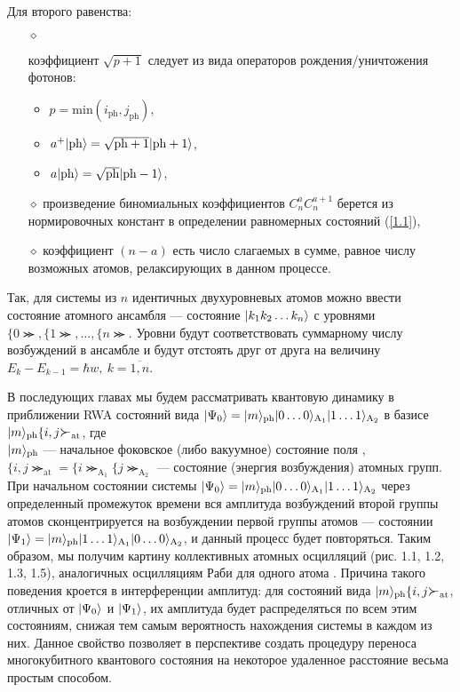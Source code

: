 Для второго равенства:
\begin{itemize}
	\item[$\diamond$]{
		коэффициент $\sqrt{p+1}$ следует из вида операторов рождения/уничтожения фотонов: 
		\begin{itemize}
			\item{$p = \mathrm{min}(i_{\mathrm{ph}}, j_{\mathrm{ph}})$,}
			\item{$a^{+}|\mathrm{ph}\rangle = \sqrt{\mathrm{ph} + 1}|\mathrm{ph} + 1\rangle$,}
			\item{$a|\mathrm{ph}\rangle = \sqrt{\mathrm{ph}}|\mathrm{ph-1}\rangle$,}
		\end{itemize}
	}
	\item[$\diamond$]{ 
		произведение биномиальных коэффициентов $C_{n}^{a}C_{n}^{a+1}$ берется из нормировочных констант в определении 	равномерных состояний (\ref{1.1})},
	\item[$\diamond$]{
		коэффициент $(n-a)$ есть число слагаемых в сумме, равное числу возможных атомов, релаксирующих в данном процессе.}
\end{itemize}

Так, для системы из $n$ идентичных двухуровневых атомов можно ввести состояние атомного ансамбля --- состояние $|k_{1}k_{2}\dots k_{n}\rangle$ с уровнями $\{0\Succ, \{1\Succ, \dots, \{n\Succ$. Уровни будут соответствовать суммарному числу возбуждений в ансамбле и будут отстоять друг от друга на величину $E_{k} - E_{k-1} = \hbar w,\ k = \overline{1,n}$.

В последующих главах мы будем рассматривать квантовую динамику в приближении RWA \cite{ozhigov_qq, rwa_1, rwa_2} состояний вида $|\Psi_0\rangle=|m\rangle_{\mathrm{ph}}|0\dots0\rangle_{\mathrm{A_{1}}} |1\dots1\rangle_{\mathrm{A_{2}}}$ в базисе $|m\ra_{\mathrm{ph}}\{i,j\Succ_{\mathrm{at}}$, где
\\
\null\qquad$|m\rangle_{\mathrm{ph}}$ --- начальное фоковское (либо вакуумное) состояние поля \cite{landau,belousov,messia},
\\[6pt]
\null\qquad$\{i,j\Succ_{\mathrm{at}}\!=\!\{i\Succ_{\mathrm{A_{1}}}\{j\Succ_{\mathrm{A_{2}}}$ --- состояние (энергия возбуждения) атомных групп.
\
\\[0pt]
\indent При начальном состоянии системы $|\Psi_0\rangle=|m\rangle_{\mathrm{ph}}|0\dots0\rangle_{\mathrm{A_{1}}} |1\dots1\rangle_{\mathrm{A_{2}}}$ через определенный промежуток времени вся амплитуда возбуждений второй группы атомов сконцентрируется на возбуждении первой группы атомов --- состоянии $|\Psi_1\rangle=|m\rangle_{\mathrm{ph}}|1\dots1\rangle_{\mathrm{A_{1}}} |0\dots0\rangle_{\mathrm{A_{2}}}$, и данный процесс будет повторяться. Таким образом, мы получим картину коллективных атомных осцилляций ({\color{red}рис. 1.1, 1.2, 1.3, 1.5}), аналогичных осцилляциям Раби для одного атома \cite{rabi_1,rabi_2,rabi_3,rabi_4}. Причина такого поведения кроется в интерференции амплитуд: для состояний вида $|m\ra_{\mathrm{ph}}\{i,j\Succ_{\mathrm{at}}$, отличных от $|\Psi_{0}\rangle$ и $|\Psi_{1}\rangle$, их амплитуда будет распределяться по всем этим состояниям, снижая тем самым вероятность нахождения системы в каждом из них. Данное свойство позволяет в перспективе создать процедуру переноса многокубитного квантового состояния на некоторое удаленное расстояние весьма простым способом.

